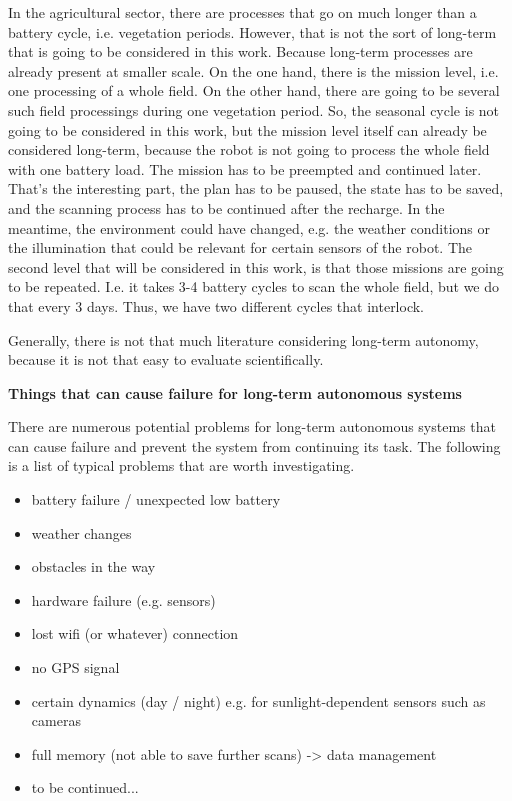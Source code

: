 \documentclass[german, master, expose, latin1]{base/thesis_KBS}
\begin{document}
In the agricultural sector, there are processes that go on much longer than a battery cycle, i.e. vegetation periods.
However, that is not the sort of long-term that is going to be considered in this work. Because long-term processes are already present at smaller scale.
On the one hand, there is the mission level, i.e. one processing of a whole field. On the other hand, there are going to be several such field processings during one vegetation
period. So, the seasonal cycle is not going to be considered in this work, but the mission level itself can already be considered long-term, because the robot is not
going to process the whole field with one battery load. The mission has to be preempted and continued later. That's the interesting part, the plan has to be paused,
the state has to be saved, and the scanning process has to be continued after the recharge. In the meantime, the environment could have changed, e.g. the weather conditions
or the illumination that could be relevant for certain sensors of the robot. The second level that will be considered in this work, is that those missions are going
to be repeated. I.e. it takes 3-4 battery cycles to scan the whole field, but we do that every 3 days. Thus, we have two different cycles that interlock.\newline

Generally, there is not that much literature considering long-term autonomy, because it is not that easy to evaluate scientifically.\newline

\textbf{Things that can cause failure for long-term autonomous systems}\newline

There are numerous potential problems for long-term autonomous systems that can cause failure and prevent the system from continuing its task.
The following is a list of typical problems that are worth investigating.

\begin{itemize}
    \item battery failure / unexpected low battery
    \item weather changes
    \item obstacles in the way
    \item hardware failure (e.g. sensors)
    \item lost wifi (or whatever) connection
    \item no GPS signal
    \item certain dynamics (day / night) e.g. for sunlight-dependent sensors such as cameras
    \item full memory (not able to save further scans) -> data management
    \item to be continued...
\end{itemize}
\end{document}
